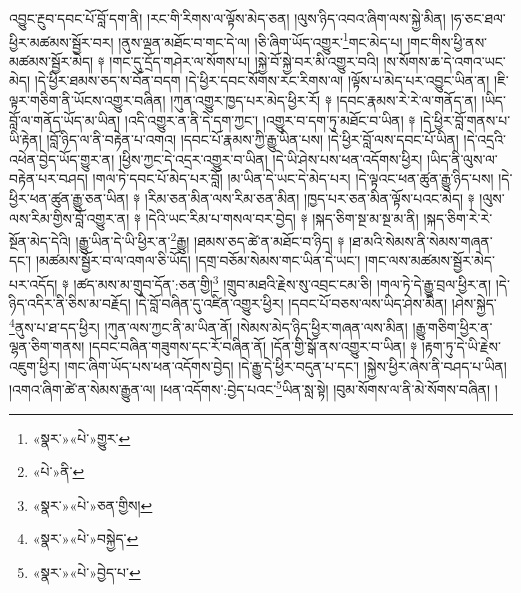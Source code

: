 འབྱུང་རྔུབ་དབང་པོ་བློ་དག་ནི། །རང་གི་རིགས་ལ་ལྟོས་མེད་ཅན། །ལུས་ཉིད་འབའ་ཞིག་ལས་སྐྱེ་མིན། །ཧ་ཅང་ཐལ་ཕྱིར་མཚམས་སྦྱོར་བར། །ནུས་ལྡན་མཐོང་བ་གང་དེ་ལ། །ཅི་ཞིག་ཡོད་འགྱུར་\footnote{«སྣར་»«པེ་»གྱུར་}གང་མེད་པ། །གང་གིས་ཕྱི་ནས་མཚམས་སྦྱོར་མེད། ༈ །གང་དུ་དྲོད་གཤེར་ལ་སོགས་པ། །སྐྱེ་བོ་སྐྱེ་བར་མི་འགྱུར་བའི། །ས་སོགས་ཆ་དེ་འགའ་ཡང་མེད། །དེ་ཕྱིར་ཐམས་ཅད་ས་བོན་བདག །དེ་ཕྱིར་དབང་སོགས་རང་རིགས་ལ། །ལྟོས་པ་མེད་པར་འབྱུང་ཡིན་ན། །ཇི་ལྟར་གཅིག་ནི་ཡོངས་འགྱུར་བཞིན། །ཀུན་འགྱུར་ཁྱད་པར་མེད་ཕྱིར་རོ། ༈ །དབང་རྣམས་རེ་རེ་ལ་གནོད་ན། །ཡིད་བློ་ལ་གནོད་ཡོད་མ་ཡིན། །འདི་འགྱུར་ན་ནི་དེ་དག་ཀྱང་། །འགྱུར་བ་དག་ཏུ་མཐོང་བ་ཡིན། ༈ །དེ་ཕྱིར་བློ་གནས་པ་ཡི་རྟེན། །བློ་ཉིད་ལ་ནི་བརྟེན་པ་འགའ། །དབང་པོ་རྣམས་ཀྱི་རྒྱུ་ཡིན་པས། །དེ་ཕྱིར་བློ་ལས་དབང་པོ་ཡིན། །དེ་འདྲའི་འཕེན་བྱེད་ཡོད་གྱུར་ན། །ཕྱིས་ཀྱང་དེ་འདྲར་འགྱུར་བ་ཡིན། །དེ་ཡི་ཤེས་པས་ཕན་འདོགས་ཕྱིར། །ཡིད་ནི་ལུས་ལ་བརྟེན་པར་བཤད། །གལ་ཏེ་དབང་པོ་མེད་པར་བློ། །མ་ཡིན་དེ་ཡང་དེ་མེད་པར། །དེ་ལྟའང་ཕན་ཚུན་རྒྱུ་ཉིད་པས། །དེ་ཕྱིར་ཕན་ཚུན་རྒྱུ་ཅན་ཡིན། ༈ །རིམ་ཅན་མིན་ལས་རིམ་ཅན་མིན། །ཁྱད་པར་ཅན་མིན་ལྟོས་པའང་མེད། ༈ །ལུས་ལས་རིམ་གྱིས་བློ་འགྱུར་ན། ༈ །དེའི་ཡང་རིམ་པ་གསལ་བར་བྱེད། ༈ །སྐད་ཅིག་སྔ་མ་སྔ་མ་ནི། །སྐད་ཅིག་རེ་རེ་སྔོན་མེད་དེའི། །རྒྱུ་ཡིན་དེ་ཡི་ཕྱིར་ན་\footnote{«པེ་»ནི་}རྒྱུ། །ཐམས་ཅད་ཚེ་ན་མཐོང་བ་ཉིད། ༈ །ཐ་མའི་སེམས་ནི་སེམས་གཞན་དང་། །མཚམས་སྦྱོར་བ་ལ་འགལ་ཅི་ཡོད། །དགྲ་བཅོམ་སེམས་གང་ཡིན་དེ་ཡང་། །གང་ལས་མཚམས་སྦྱོར་མེད་པར་འདོད། ༈ །ཚད་མས་མ་གྲུབ་དོན་:ཅན་གྱི།\footnote{«སྣར་»«པེ་»ཅན་གྱིས།} །གྲུབ་མཐའི་རྗེས་སུ་འབྲང་ངམ་ཅི། །གལ་ཏེ་དེ་རྒྱུ་བྲལ་ཕྱིར་ན། །དེ་ཉིད་འདིར་ནི་ཅིས་མ་བརྗོད། །དེ་བློ་བཞིན་དུ་འཛིན་འགྱུར་ཕྱིར། །དབང་པོ་བཅས་ལས་ཡིད་ཤེས་མིན། །ཤེས་སྐྱེད་\footnote{«སྣར་»«པེ་»བསྐྱེད་}ནུས་པ་ཐ་དད་ཕྱིར། །ཀུན་ལས་ཀྱང་ནི་མ་ཡིན་ནོ། །སེམས་མེད་ཉིད་ཕྱིར་གཞན་ལས་མིན། །རྒྱུ་གཅིག་ཕྱིར་ན་ལྷན་ཅིག་གནས། །དབང་བཞིན་གཟུགས་དང་རོ་བཞིན་ནོ། །དོན་གྱི་སྒོ་ནས་འགྱུར་བ་ཡིན། ༈ །རྟག་ཏུ་དེ་ཡི་རྗེས་འཇུག་ཕྱིར། །གང་ཞིག་ཡོད་པས་ཕན་འདོགས་བྱེད། །དེ་རྒྱུ་དེ་ཕྱིར་བདུན་པ་དང་། །སྐྱེས་ཕྱིར་ཞེས་ནི་བཤད་པ་ཡིན། །འགའ་ཞིག་ཚེ་ན་སེམས་རྒྱུན་ལ། །ཕན་འདོགས་:བྱེད་པའང་\footnote{«སྣར་»«པེ་»བྱེད་པ་}ཡིན་སླ་སྟེ། །བུམ་སོགས་ལ་ནི་མེ་སོགས་བཞིན། །
